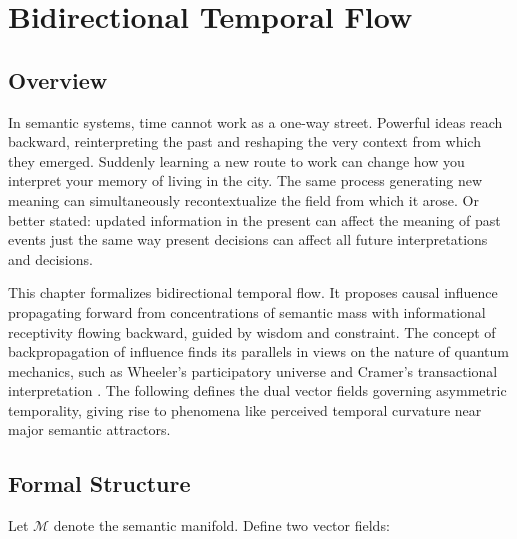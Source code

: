 \chapter{Bidirectional Temporal Flow}

\section{Overview}

In semantic systems, time cannot work as a one-way street. Powerful ideas reach backward, reinterpreting the past and reshaping the very context from which they emerged. Suddenly learning a new route to work can change how you interpret your memory of living in the city. The same process generating new meaning can simultaneously recontextualize the field from which it arose. Or better stated: updated information in the present can affect the meaning of past events just the same way present decisions can affect all future interpretations and decisions.

This chapter formalizes bidirectional temporal flow. It proposes causal influence propagating forward from concentrations of semantic mass with informational receptivity flowing backward, guided by wisdom and constraint. The concept of backpropagation of influence finds its parallels in views on the nature of quantum mechanics, such as Wheeler's participatory universe and Cramer's transactional interpretation \autocite{WheelerZurek1983, Cramer1986}. The following defines the dual vector fields governing asymmetric temporality, giving rise to phenomena like perceived temporal curvature near major semantic attractors.

\section{Formal Structure}

Let \(\mathcal{M}\) denote the semantic manifold. Define two vector fields:

